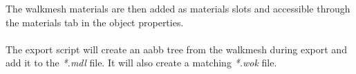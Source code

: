 The walkmesh materials are then added as materials slots and accessible
through the materials tab in the object properties. \\ \\

The export script will create an aabb tree from the walkmesh during export
and add it to the {\textit{*.mdl}} file. It will also create a
matching {\textit{*.wok}} file.

